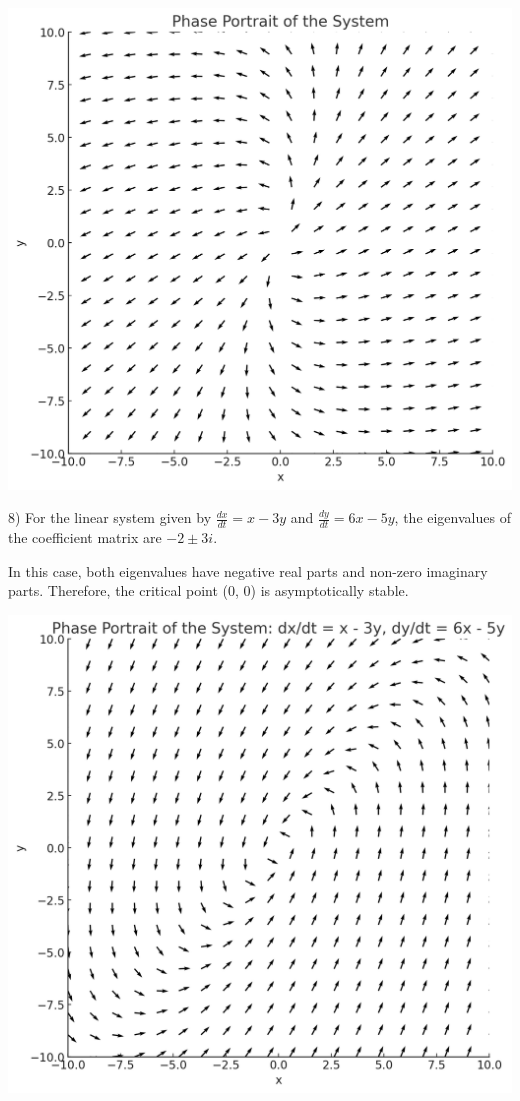 \documentclass{article}
\begin{document}
\includegraphics[width=\linewidth]{6_2_2}

8) For the linear system given by $\frac{dx}{dt} = x - 3y$ and
$\frac{dy}{dt} = 6x - 5y$, the eigenvalues of the coefficient matrix are
$-2 \pm 3i$.

In this case, both eigenvalues have negative real parts and non-zero imaginary parts.
Therefore, the critical point (0, 0) is asymptotically stable.

\includegraphics[width=\linewidth]{6_2_8}
\end{document}
